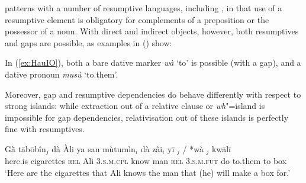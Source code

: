 \documentclass[output=paper
,notxmath 
 	        ,biblatex
                ,babelshorthands
                ,newtxmath
                ,draftmode
                ,colorlinks, citecolor=brown
]{langscibook}
\begin{document}
 patterns with a number of resumptive languages, including , in that use of a
resumptive element is obligatory for
complements of a preposition or the possessor of a noun. With direct and indirect objects, however,
both resumptives and gaps are possible, as  examples in () show: 

\eal
\label{ex:HauIO}
\zl


\noindent
In (\ref{ex:HauIO}), both a bare dative marker \textit{wà} `to' is
possible (with a gap), and a dative pronoun \textit{musù} `to.them'.

Moreover, gap and resumptive dependencies do behave differently with
respect to strong islands: while extraction out of a relative clause
or \emph{wh}"=island is impossible for gap dependencies,
relativisation out of these islands is perfectly fine with
resumptives.

\ea
\label{ex:HauResLongIO}
\gll Gā̀      tābōbîn$_j$ dà          Àli ya                 san  mùtumìn$_i$ dà           zâi$_i$            yī $_j$ /  *{wà \trace{}$_j$}   kwālī\footnotemark\\
     here.is cigarettes \textsc{rel} Ali \textsc{3.s.m.cpl} know man         \textsc{rel} \textsc{3.s.m.fut} do to.them           {} \hphantom{*}to     box\\
    \glt `Here are the cigarettes that Ali knows the man that (he) will make a box for.'
\z
\end{document}

